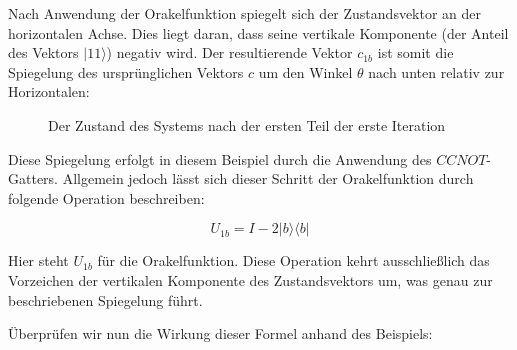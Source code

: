 Nach Anwendung der Orakelfunktion spiegelt sich der Zustandsvektor an der horizontalen Achse. Dies liegt daran, dass seine vertikale Komponente (der Anteil des Vektors $|11\rangle$) negativ wird. Der resultierende Vektor $c_{1b}$ ist somit die Spiegelung des ursprünglichen Vektors $c$ um den Winkel $\theta$ nach unten relativ zur Horizontalen:

\begin{figure}[H]
    \centering
{}
    \caption{Der Zustand des Systems nach der ersten Teil der erste Iteration}
    \label{fig:after-first-part-grover-three-qubits}
\end{figure}

Diese Spiegelung erfolgt in diesem Beispiel durch die Anwendung des $CCNOT$-Gatters. Allgemein jedoch lässt sich dieser Schritt der Orakelfunktion durch folgende Operation beschreiben:

$$
U_{1b} = I - 2|b\rangle \langle b|
$$

Hier steht $U_{1b}$ für die Orakelfunktion. Diese Operation kehrt ausschließlich das Vorzeichen der vertikalen Komponente des Zustandsvektors um, was genau zur beschriebenen Spiegelung führt.

Überprüfen wir nun die Wirkung dieser Formel anhand des Beispiels:

